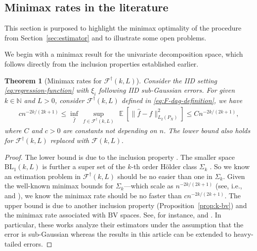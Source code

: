 \documentclass[12pt]{article}
\DeclareMathOperator*{\E}{\mathbb{E}}
\newtheorem{theorem}{Theorem}[section]
\begin{document}
\subsection{Minimax rates in the literature}
This section is purposed to highlight the minimax optimality of the procedure from Section~\ref{sec:estimator} and to illustrate some open problems. 

We begin with a minimax result for the univariate decomposition space, which follows directly from the inclusion properties established earlier.
\begin{theorem}[Minimax rates for $\mathcal{F}^\dag(k, L)$]\label{theorem:minimax-rate} Consider the IID setting \eqref{eq:regression-function} with $\xi_i$ following IID sub-Gaussian errors. For given $k\in\mathbb{N}$ and $L > 0$, consider $\mathcal{F}^\dag(k, L)$ defined in \eqref{eq:F-dag-definition}, we have 
\begin{align*}
    cn^{-2k/(2k+1)}\le \inf_{\widehat f}\, \sup_{f \in \mathcal{F}^\dagger(k,L)}\, \E 
    [\|\widehat f - f\|_{L_2(P_X)}^2]\le  Cn^{-2k/(2k+1)},
\end{align*}
where $C$ and $c > 0$ are constants not depending on $n$. The lower bound also holds for $\mathcal{F}^\dagger(k,L)$ replaced with $\mathcal{F}(k, L)$.
\end{theorem}

\begin{proof}
The lower bound is due to the inclusion property . The smaller space $\mathrm{BL}_1(k, L)$ is further a super set of the $k$-th order H\"{o}lder class $\Sigma_k$ \citep[page 351 and the references therein]{gine2021mathematical}. So we know an estimation problem in $\mathcal{F}^{\dagger}(k, L)$ should be no easier than one in $\Sigma_k$. Given the well-known minimax bounds for $\Sigma_k$---which scale as $n^{-2k/(2k+1)}$ (see, i.e., \citep{stone1982optimal} and \citep{ibragimov1984asymptotic}), we know the minimax rate should be no faster than $c n^{-2 k /(2 k+1)}$. The upper bound is due to another inclusion property (Proposition~\ref{prop:k-bv}) and the minimax rate associated with $\mathrm{BV}$ spaces. See, for instance, \citet[Theorem 10]{mammen2007additive} and \citet[Theorem 1]{tibshirani2014adaptive}. In particular, these works analyze their estimators under the assumption that the error is sub-Gaussian whereas the results in this article can be extended to heavy-tailed errors.
\end{proof}
\end{document}
